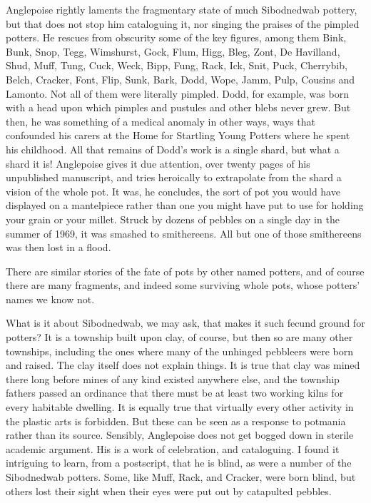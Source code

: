 Anglepoise rightly laments the fragmentary state of much Sibodnedwab pottery, but that does not stop him cataloguing it, nor singing the praises of the pimpled potters. He rescues from obscurity some of the key figures, among them Bink, Bunk, Snop, Tegg, Wimshurst, Gock, Flum, Higg, Bleg, Zont, De Havilland, Shud, Muff, Tung, Cuck, Weck, Bipp, Fung, Rack, Ick, Snit, Puck, Cherrybib, Belch, Cracker, Font, Flip, Sunk, Bark, Dodd, Wope, Jamm, Pulp, Cousins and Lamonto. Not all of them were literally pimpled. Dodd, for example, was born with a head upon which pimples and pustules and other blebs never grew. But then, he was something of a medical anomaly in other ways, ways that confounded his carers at the Home for Startling Young Potters where he spent his childhood. All that remains of Dodd's work is a single shard, but what a shard it is! Anglepoise gives it due attention, over twenty pages of his unpublished manuscript, and tries heroically to extrapolate from the shard a vision of the whole pot. It was, he concludes, the sort of pot you would have displayed on a mantelpiece rather than one you might have put to use for holding your grain or your millet. Struck by dozens of pebbles on a single day in the summer of 1969, it was smashed to smithereens. All but one of those smithereens was then lost in a flood.

There are similar stories of the fate of pots by other named potters, and of course there are many fragments, and indeed some surviving whole pots, whose potters' names we know not.

What is it about Sibodnedwab, we may ask, that makes it such fecund ground for potters? It is a township built upon clay, of course, but then so are many other townships, including the ones where many of the unhinged pebbleers were born and raised. The clay itself does not explain things. It is true that clay was mined there long before mines of any kind existed anywhere else, and the township fathers passed an ordinance that there must be at least two working kilns for every habitable dwelling. It is equally true that virtually every other activity in the plastic arts is forbidden. But these can be seen as a response to potmania rather than its source. Sensibly, Anglepoise does not get bogged down in sterile academic argument. His is a work of celebration, and cataloguing. I found it intriguing to learn, from a postscript, that he is blind, as were a number of the Sibodnedwab potters. Some, like Muff, Rack, and Cracker, were born blind, but others lost their sight when their eyes were put out by catapulted pebbles.

